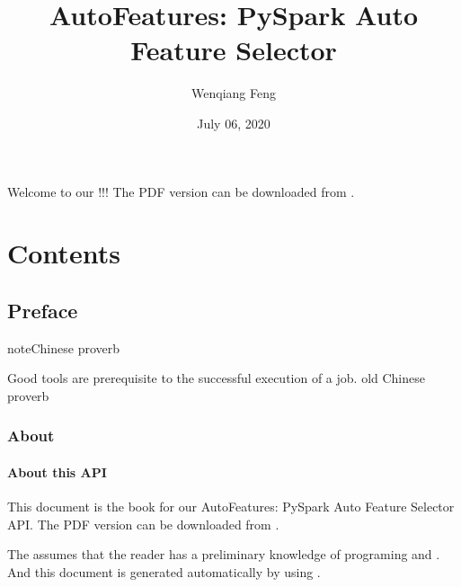 \documentclass[letterpaper,11pt,english]{sphinxmanual}
\title{AutoFeatures: PySpark Auto Feature Selector}
\date{July 06, 2020}
\author{Wenqiang Feng}
\begin{document}
\pagestyle{empty}
\sphinxmaketitle
\pagestyle{plain}
\sphinxtableofcontents
\pagestyle{normal}
\label{\detokenize{index::doc}}

\begin{quote}

\begin{figure}[htbp]
\centering

\noindent{}
\end{figure}
\end{quote}

Welcome to our !!! The PDF version
can be downloaded from .


\chapter{Contents}
\label{\detokenize{index:contents}}

\section{Preface}
\label{\detokenize{preface:preface}}\label{\detokenize{preface:id1}}\label{\detokenize{preface::doc}}
\begin{sphinxadmonition}{note}{Chinese proverb}

Good tools are prerequisite to the successful execution of a job. \textendash{} old Chinese proverb
\end{sphinxadmonition}


\subsection{About}
\label{\detokenize{preface:about}}

\subsubsection{About this API}
\label{\detokenize{preface:about-this-api}}
This document is the  book for our AutoFeatures: PySpark Auto Feature Selector  API.
The PDF version can be downloaded from . 

The  assumes that the reader has a preliminary knowledge of  programing and . And this
document is generated automatically by using .
\end{document}
